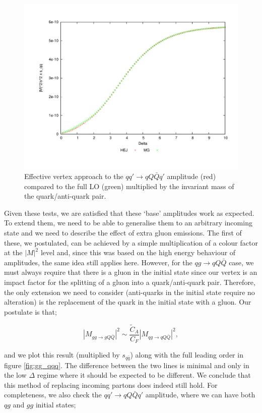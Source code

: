 \begin{figure}[H]
\centering
\includegraphics[scale=0.45]{Images/qQ_qqqxQ_sqqx.pdf}
\caption{Effective vertex approach to the $qq' \to qQ\bar{Q}q'$ amplitude (red) compared to the full LO (green) multiplied by the invariant mass of the quark/anti-quark pair.}
\label{fig:qq_qqqq_sqq}
\end{figure}

Given these tests, we are satisfied that these `base' amplitudes work as expected. To extend them, we need to be able to generalise them to an arbitrary incoming state and we need to describe the effect of extra gluon emissions. The first of these, we postulated, can be achieved by a simple multiplication of a colour factor at the $|M|^2$ level and, since this was based on the high energy behaviour of amplitudes, the same idea still applies here. However, for the $qg \to qQ\bar{Q}$ case, we must always require that there is a gluon in the initial state since our vertex is an impact factor for the splitting of a gluon into a quark/anti-quark pair. Therefore, the only extension we need to consider (anti-quarks in the initial state require no alteration) is the replacement of the quark in the initial state with a gluon. Our postulate is that;

\begin{equation}
|M_{gg \to gQ\bar{Q}}|^2 \sim \frac{\tilde{C}_A}{C_F} |M_{qg \to qQ\bar{Q}}|^2,
\end{equation}

and we plot this result (multiplied by $s_{q\bar{q}}$) along with the full leading order in figure \ref{fig:gg_qqq}. The difference between the two lines is minimal and only in the low $\Delta$ regime where it should be expected to be different. We conclude that this method of replacing incoming partons does indeed still hold. For completeness, we also check the $qq' \to qQ\bar{Q}q'$ amplitude, where we can have both $qg$ and $gg$ initial states;

